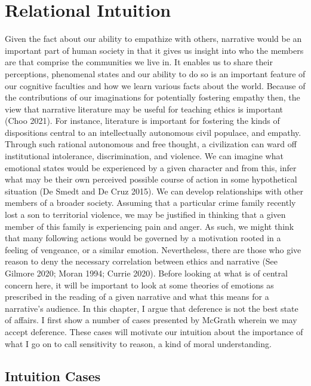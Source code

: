 \documentclass[
  letterpaper,
  DIV=11,
  numbers=noendperiod]{scrartcl}
\theoremstyle{remark}
\begin{document}
\section{Relational Intuition}\label{relational-intuition}

Given the fact about our ability to empathize with others, narrative
would be an important part of human society in that it gives us insight
into who the members are that comprise the communities we live in. It
enables us to share their perceptions, phenomenal states and our ability
to do so is an important feature of our cognitive faculties and how we
learn various facts about the world. Because of the contributions of our
imaginations for potentially fostering empathy then, the view that
narrative literature may be useful for teaching ethics is important
(Choo 2021). For instance, literature is important for fostering the
kinds of dispositions central to an intellectually autonomous civil
populace, and empathy. Through such rational autonomous and free
thought, a civilization can ward off institutional intolerance,
discrimination, and violence. We can imagine what emotional states would
be experienced by a given character and from this, infer what may be
their own perceived possible course of action in some hypothetical
situation (De Smedt and De Cruz 2015). We can develop relationships with
other members of a broader society. Assuming that a particular crime
family recently lost a son to territorial violence, we may be justified
in thinking that a given member of this family is experiencing pain and
anger. As such, we might think that many following actions would be
governed by a motivation rooted in a feeling of vengeance, or a similar
emotion. Nevertheless, there are those who give reason to deny the
necessary correlation between ethics and narrative (See Gilmore 2020;
Moran 1994; Currie 2020). Before looking at what is of central concern
here, it will be important to look at some theories of emotions as
prescribed in the reading of a given narrative and what this means for a
narrative's audience. In this chapter, I argue that deference is not the
best state of affairs. I first show a number of cases presented by
McGrath wherein we may accept deference. These cases will motivate our
intuition about the importance of what I go on to call sensitivity to
reason, a kind of moral understanding.

\subsection{Intuition Cases}\label{intuition-cases}
\end{document}
